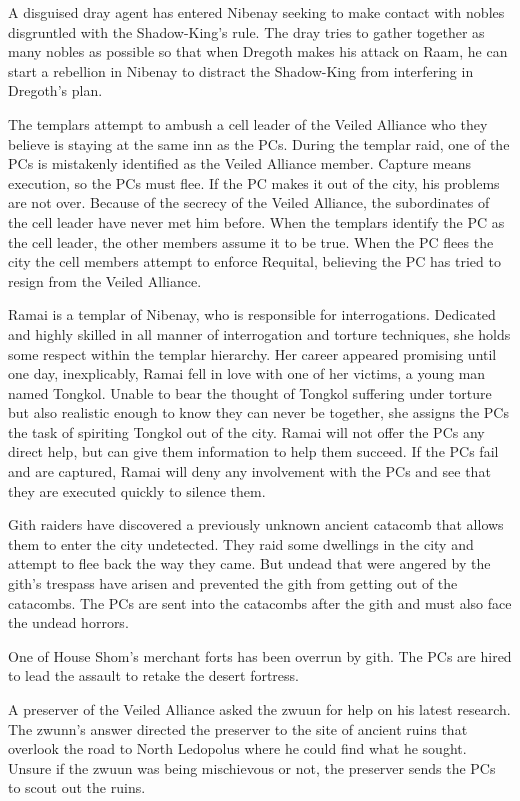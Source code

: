 {
	\item A disguised dray agent has entered Nibenay seeking to make contact with nobles disgruntled with the Shadow-King's rule. The dray tries to gather together as many nobles as possible so that when Dregoth makes his attack on Raam, he can start a rebellion in Nibenay to distract the Shadow-King from interfering in Dregoth's plan.
	\item The templars attempt to ambush a cell leader of the Veiled Alliance who they believe is staying at the same inn as the PCs. During the templar raid, one of the PCs is mistakenly identified as the Veiled Alliance member. Capture means execution, so the PCs must flee. If the PC makes it out of the city, his problems are not over. Because of the secrecy of the Veiled Alliance, the subordinates of the cell leader have never met him before. When the templars identify the PC as the cell leader, the other members assume it to be true. When the PC flees the city the cell members attempt to enforce Requital, believing the PC has tried to resign from the Veiled Alliance.
	\item Ramai is a templar of Nibenay, who is responsible for interrogations. Dedicated and highly skilled in all manner of interrogation and torture techniques, she holds some respect within the templar hierarchy. Her career appeared promising until one day, inexplicably, Ramai fell in love with one of her victims, a young man named Tongkol. Unable to bear the thought of Tongkol suffering under torture but also realistic enough to know they can never be together, she assigns the PCs the task of spiriting Tongkol out of the city. Ramai will not offer the PCs any direct help, but can give them information to help them succeed. If the PCs fail and are captured, Ramai will deny any involvement with the PCs and see that they are executed quickly to silence them.
	\item Gith raiders have discovered a previously unknown ancient catacomb that allows them to enter the city undetected. They raid some dwellings in the city and attempt to flee back the way they came. But undead that were angered by the gith's trespass have arisen and prevented the gith from getting out of the catacombs. The PCs are sent into the catacombs after the gith and must also face the undead horrors.
	\item One of House Shom's merchant forts has been overrun by gith. The PCs are hired to lead the assault to retake the desert fortress.
	\item A preserver of the Veiled Alliance asked the zwuun for help on his latest research. The zwunn's answer directed the preserver to the site of ancient ruins that overlook the road to North Ledopolus where he could find what he sought. Unsure if the zwuun was being mischievous or not, the preserver sends the PCs to scout out the ruins.
}